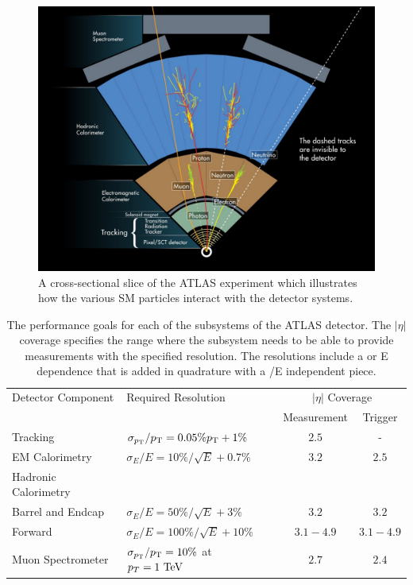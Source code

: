 \begin{figure}[hbtp]
\includegraphics[width=\fullfig]{figures/particle_interactions.png}
\caption{A cross-sectional slice of the \ac{ATLAS} experiment which illustrates how the various \ac{SM} particles interact with the detector systems.}
\label{fig:particle_interactions}
\end{figure}

\begin{table}
\centering
\begin{tabular}{llcc}
  \hline
  Detector Component & Required Resolution & \multicolumn{2}{c}{$|\eta|$ Coverage} \\
                     &                     & Measurement & Trigger \\
  \hline
  Tracking & $\sigma_{p_{\mathrm{T}}}/p_{\mathrm{T}} = 0.05\% p_{\mathrm{T}} + 1\%$ & $2.5$ & - \\
  EM Calorimetry & $\sigma_{E}/E = 10\%/\sqrt{E} + 0.7\%$ & $3.2$ & $2.5$ \\
  Hadronic Calorimetry & & \\
  \quad Barrel and Endcap & $\sigma_{E}/E = 50\%/\sqrt{E} + 3\%$ & $3.2$ & $3.2$ \\
  \quad Forward & $\sigma_{E}/E = 100\%/\sqrt{E} + 10\%$ & $3.1 - 4.9$ & $3.1 - 4.9$ \\
  Muon Spectrometer & $\sigma_{p_{\mathrm{T}}}/p_{\mathrm{T}} = 10\%$ at $p_T = 1\ \mathrm{Te\kern -0.05em V}$ & $2.7$ & $2.4$ \\
  \hline
\end{tabular}
\caption{The performance goals for each of the subsystems of the \ac{ATLAS} detector. The $|\eta|$ coverage specifies the range where the subsystem needs to be able to provide measurements with the specified resolution. The resolutions include a \pt or E dependence that is added in quadrature with a \pt/E independent piece.}
\label{tab:performance_goals}
\end{table}

